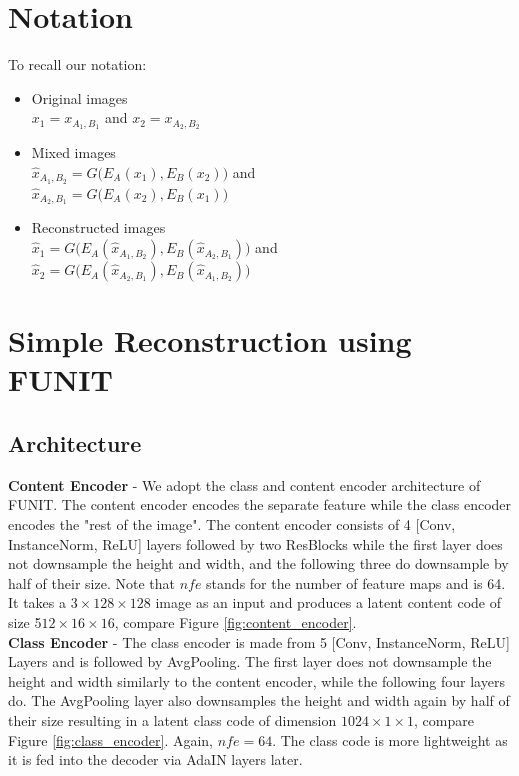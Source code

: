 \documentclass{article}
\begin{document}
\begin{multicols}{2}

\section{Notation}

To recall our notation: 

\begin{itemize}
	\item Original images \\$x_1 = x_{A_1,B_1}$ and $x_2 = x_{A_2,B_2}$
	\item Mixed images \\$\hat{x}_{A_1,B_2} = G \big (E_A(x_1), E_B(x_2) \big)$ and \\$\hat{x}_{A_2,B_1} = G \big (E_A(x_2), E_B(x_1) \big)$
	\item Reconstructed images \\$\hat{x}_1= G \big (E_A(\hat{x}_{A_1,B_2}), E_B(\hat{x}_{A_2,B_1}) \big)  $ and \\$\hat{x}_2  = G \big (E_A(\hat{x}_{A_2,B_1}), E_B(\hat{x}_{A_1,B_2}) \big)  $
\end{itemize}


\section{Simple Reconstruction using FUNIT}

\subsection{Architecture}

\textbf{Content Encoder} - We adopt the class and content encoder architecture of FUNIT. The content encoder encodes the separate feature while the class encoder encodes the "rest of the image". The content encoder consists of 4 [Conv, InstanceNorm, ReLU] layers followed by two ResBlocks while the first layer does not downsample the height and width, and the following three do downsample by half of their size. Note that $nfe$ stands for the number of feature maps and is 64. It takes a $3 \times 128 \times 128$ image as an input and produces a latent content code of size 5$12 \times 16 \times 16$, compare Figure \ref{fig:content_encoder}.\\
\newline
\textbf{Class Encoder} - The class encoder is made from 5 [Conv, InstanceNorm, ReLU] Layers and is followed by AvgPooling. The first layer does not downsample the height and width similarly to the content encoder, while the following four layers do. The AvgPooling layer also downsamples the height and width again by half of their size resulting in a latent class code of dimension $1024 \times 1 \times 1$, compare Figure \ref{fig:class_encoder}. Again, $nfe = 64$. The class code is more lightweight as it is fed into the decoder via AdaIN layers later.


\end{multicols}
\end{document}
